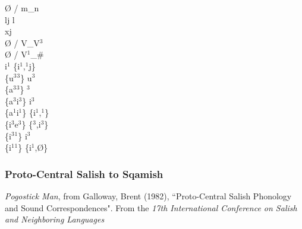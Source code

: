 \documentclass[11pt]{article}
\begin{document}
 \textrightarrow\hspace{0pt} \O\hspace{0pt} / m_n \\
l\super j \textrightarrow\hspace{0pt} l \\
x\super j \textrightarrow\hspace{0pt}  \\
 \textrightarrow\hspace{0pt} \O\hspace{0pt} / V_V$^3$ \\
 \textrightarrow\hspace{0pt} \O\hspace{0pt} / V$^1$_\# \\
i$^1$ \textrightarrow\hspace{0pt} \{i$^1$,$^1$j\} \\
\{u$^3$\raisebox{-0.7ex}{\textasciitilde}$^3$\} \textrightarrow\hspace{0pt} u$^3$ \\
\{a$^3$\raisebox{-0.7ex}{\textasciitilde}$^3$\} \textrightarrow\hspace{0pt} $^3$ \\
\{a$^3$\raisebox{-0.7ex}{\textasciitilde}i$^3$\} \textrightarrow\hspace{0pt} i$^3$ \\
\{a$^1$\raisebox{-0.7ex}{\textasciitilde}i$^1$\} \textrightarrow\hspace{0pt} \{i$^1$,$^1$\} \\
\{i$^3$\raisebox{-0.7ex}{\textasciitilde}e$^3$\} \textrightarrow\hspace{0pt} \{$^3$,i$^3$\} \\
\{i$^3$\raisebox{-0.7ex}{\textasciitilde}$^1$\} \textrightarrow\hspace{0pt} i$^3$ \\
\{i$^1$\raisebox{-0.7ex}{\textasciitilde}$^1$\} \textrightarrow\hspace{0pt} \{i$^1$,\O\}

\subsubsection{Proto-Central Salish to Sqamish}\textit{Pogostick Man}, from Galloway, Brent (1982), \textquotedblleft Proto-Central Salish Phonology and Sound Correspondences". From the \textit{17th International Conference on Salish and Neighboring Languages}
\end{document}
